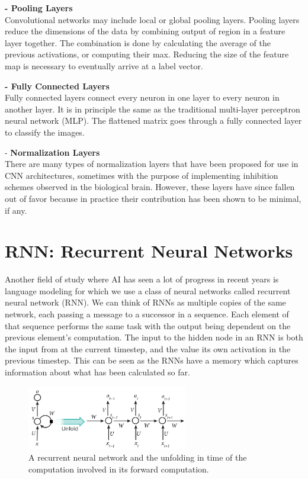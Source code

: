 \documentclass{ieee}
\begin{document}
\textbf{- Pooling Layers} \\
Convolutional networks may include local or global pooling layers. Pooling layers reduce the dimensions of the data by combining output of region in a feature layer together. The combination is done by calculating the average of the previous activations, or computing their max. Reducing the size of the feature map is necessary to eventually arrive at a label vector.

\textbf{- Fully Connected Layers} \\
Fully connected layers connect every neuron in one layer to every neuron in another layer. It is in principle the same as the traditional multi-layer perceptron neural network (MLP). The flattened matrix goes through a fully connected layer to classify the images.

- \textbf{Normalization Layers} \\
There are many types of normalization layers that have been proposed for use in CNN architectures, sometimes with the purpose of implementing inhibition schemes observed in the biological brain. However, these layers have since fallen out of favor because in practice their contribution has been shown to be minimal, if any. 



\section{RNN: Recurrent Neural Networks}
Another field of study where AI has seen a lot of progress in recent years is language modeling for which we use a class of neural networks called recurrent neural network (RNN). We can think of RNNs as multiple copies of the same network, each passing a message to a successor in a sequence. Each element of that sequence performs the same task with the output being dependent on the previous element's computation.  The input to the hidden node in an RNN is both the input from at the current timestep, and the value its own activation in the previous timestep. This can be seen as the RNNs have a memory which captures information about what has been calculated so far.
\begin{figure}[h]
    \begin{center}
    \includegraphics[width=7cm]{images/rnn.jpg}
    \end{center}
    \label{fig:rnn_fig}
    \caption{A recurrent neural network and the unfolding in time of the computation involved in its forward computation. \cite{RNN}}
\end{figure}
\end{document}
